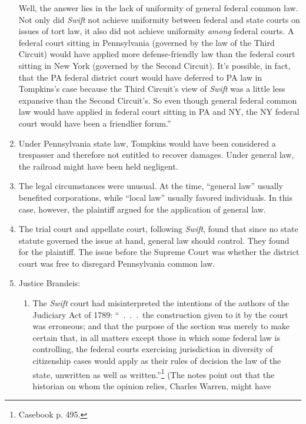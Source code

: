 \begin{enumerate}
{    Well, the answer lies in the lack of uniformity of general federal
    common law. Not only did \emph{Swift} not achieve uniformity between 
    federal and state courts on issues of tort law, it also did not achieve 
    uniformity \emph{among} federal courts. A federal court sitting in 
    Pennsylvania (governed by the law of the Third Circuit) would have applied 
    more defense-friendly law than the federal court sitting in New York 
    (governed by the Second Circuit). It's possible, in fact, that the PA 
    federal district court would have deferred to PA law in Tompkins's case 
    because the Third Circuit's view of \emph{Swift} was a little less 
    expansive than the Second Circuit's. So even though general federal 
    common law would have applied in federal court sitting in PA and NY, the 
    NY federal court would have been a friendlier forum.''}
    \item Under Pennsylvania state law, Tompkins would have been considered a 
    trespasser and therefore not entitled to recover damages. Under general 
    law, the railroad might have been held negligent.
    \item The legal circumstances were unusual. At the time, ``general law'' 
    usually benefited corporations, while ``local law'' usually favored 
    individuals. In this case, however, the plaintiff argued for the 
    application of general law.
    \item The trial court and appellate court, following \emph{Swift}, found 
    that since no state statute governed the issue at hand, general law should 
    control. They found for the plaintiff. The issue before the Supreme Court 
    was whether the district court was free to disregard Pennsylvania common 
    law.
    \item Justice Brandeis:
    \begin{enumerate}
        \item The \emph{Swift} court had misinterpreted the intentions of the 
        authors of the Judiciary Act of 1789: ``~.~.~.~the construction given to 
        it by the court was erroneous; and that the purpose of the section was 
        merely to make certain that, in all matters except those in which some 
        federal law is controlling, the federal courts exercising jurisdiction 
        in diversity of citizenship cases would apply as their rules of 
        decision the law of the state, unwritten as well as 
        written.''\footnote{Casebook p. 495.} (The notes point out that the 
        historian on whom the opinion relies, Charles Warren, might have 

\end{enumerate}
\end{enumerate}
